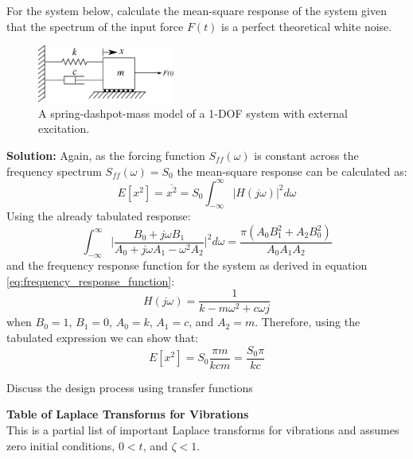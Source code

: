 \documentclass[12pt,letter]{article}
\begin{document}
\begin{example}
	For the system below, calculate the mean-square response of the system given that the spectrum of the input force $F(t)$ is a perfect theoretical white noise.
	\begin{figure}[H]
		\centering
		\includegraphics[width=0.4\textwidth]{../figures/1-DOF-spring_dashpot_mass_horizontal_forced.png}
		\caption{A spring-dashpot-mass model of a 1-DOF system with external excitation.}
	\end{figure}
	\noindent\textbf{Solution:} Again, as the forcing function $S_{ff}(\omega)$ is constant across the frequency spectrum $S_{ff}(\omega)=S_0$ the mean-square response can be calculated as:
	\begin{equation}
		E[x^2] = \overline{x^2} =   S_{0} \int_{-\infty}^{\infty} |H(j\omega)|^2 d\omega
	\end{equation}
	Using the already tabulated response:
	\begin{equation}
		\int_{-\infty}^{\infty} \bigg|\frac{B_0 + j \omega B_1}{A_0+j \omega A_1 - \omega^2 A_2} \bigg|^2 d\omega = \frac{\pi (A_0 B_1^2 + A_2 B_0^2)}{A_0 A_1 A_2}
	\end{equation} 
	and the frequency response function for the system as derived in equation \ref{eq:frequency_response_function}:
	\begin{equation}
		H(j\omega) = \frac{1}{k-m\omega^2+c\omega j}
	\end{equation}
	when $B_0=1$, $B_1 = 0$, $A_0=k$, $A_1=c$, and $A_2 =m$. Therefore, using the tabulated expression we can show that:
	\begin{equation}
		E[x^2] = S_0 \frac{\pi m }{k c m} =  \frac{S_0 \pi}{k c}
	\end{equation} 
\end{example}			
			
			
			

	\begin{vibration_case_study}
		Discuss the design process using transfer functions
	\end{vibration_case_study}
					
\pagebreak			
			\pagestyle{empty}
			\vspace{-25ex}
			\begin{center}
			{\large{}\textbf{Table of Laplace Transforms for Vibrations}} \\
			\normalsize{} This is a partial list of important Laplace transforms for vibrations and assumes \\ zero initial conditions, $0 < t$, and $\zeta < 1$.
			\end{center}
			
\end{document}
